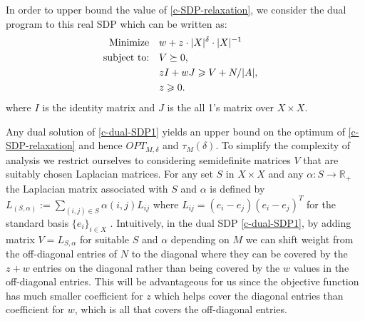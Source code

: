 In order to upper bound the value of \eqref{c-SDP-relaxation},
we consider the dual program to this real SDP which can be written as:
\begin{equation} \label{c-dual-SDP1}
\begin{aligned}
\text{Minimize}  &\quad w+z\cdot |X|^{\delta}\cdot |X|^{-1} &\\
\text{subject to:}&\quad V\succeq 0,&\\
&\quad z I + w J\geqslant V+ N/|A|,\\
&\quad z\geqslant 0.
\end{aligned}
\end{equation}
where $I$ is the identity matrix and $J$ is the all 1's matrix over $X\times X$.

Any dual solution of \eqref{c-dual-SDP1} yields an upper bound on the optimum
of \eqref{c-SDP-relaxation} and hence $OPT_{M,\delta}$ and $\tau_M(\delta)$.
To simplify the complexity of analysis we restrict ourselves to considering
semidefinite matrices $V$ that are suitably chosen Laplacian matrices.
For any set $S$ in $X\times X$ and any $\alpha:S\rightarrow \mathbb{R}_+$
the Laplacian matrix associated with $S$ and $\alpha$
is defined by $L_{(S,\alpha)}:=\sum_{(i,j)\in S}\alpha(i,j) L_{ij}$ where
$L_{ij}=(e_i-e_j)(e_i-e_j)^T$ for the standard basis $\{e_i\}_{i\in X}$ .
Intuitively, in the dual SDP \eqref{c-dual-SDP1}, by adding matrix $V=L_{S,\alpha}$ for
suitable $S$ and $\alpha$ depending on $M$ we can shift weight from the
off-diagonal
entries of $N$ to the diagonal where they can be covered by the
$z+w$ entries on the diagonal rather than being covered by the $w$ values in
the off-diagonal entries.  This will be advantageous for us since the
objective function has much smaller coefficient for $z$ which helps cover
the diagonal entries than coefficient for $w$, which is all that covers the
off-diagonal entries.

